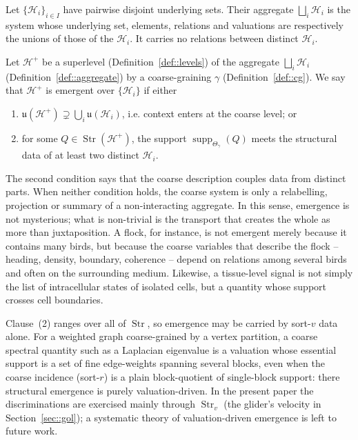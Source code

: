 \documentclass[runningheads]{llncs}
\newcommand{\Str}{\operatorname{Str}}
\newcommand{\supp}{\operatorname{supp}}
\begin{document}
\begin{definition}[Aggregate]\label{def::aggregate}
Let $\{\mathcal H_i\}_{i\in I}$ have pairwise disjoint underlying sets. Their aggregate $\bigsqcup_i\mathcal H_i$ is the system whose underlying set, elements, relations and valuations are respectively the unions of those of the $\mathcal H_i$. It carries no relations between distinct $\mathcal H_i$.
\end{definition}

\begin{definition}\label{def::emerg}
Let $\mathcal H^+$ be a superlevel (Definition~\ref{def::levels}) of the aggregate $\bigsqcup_i\mathcal H_i$ (Definition~\ref{def::aggregate}) by a coarse-graining $\gamma$ (Definition~\ref{def::cg}). We say that $\mathcal H^+$ is emergent over $\{\mathcal H_i\}$ if either
\begin{enumerate}
\item $\mathfrak u(\mathcal H^+)\supsetneq\bigcup_i\mathfrak u(\mathcal H_i)$, i.e. context enters at the coarse level; or
\item for some $Q\in\Str(\mathcal H^+)$, the support $\supp_{\Theta_\gamma}(Q)$ meets the structural data of at least two distinct $\mathcal H_i$.
\end{enumerate}
\end{definition}

The second condition says that the coarse description couples data from distinct parts. When neither condition holds, the coarse system is only a relabelling, projection or summary of a non-interacting aggregate. In this sense, emergence is not mysterious; what is non-trivial is the transport that creates the whole as more than juxtaposition. A flock, for instance, is not emergent merely because it contains many birds, but because the coarse variables that describe the flock -- heading, density, boundary, coherence -- depend on relations among several birds and often on the surrounding medium. Likewise, a tissue-level signal is not simply the list of intracellular states of isolated cells, but a quantity whose support crosses cell boundaries.

\begin{remark}\label{rem::valemerg}
Clause~(2) ranges over all of $\Str$, so emergence may be carried by sort-$v$ data alone. For a weighted graph coarse-grained by a vertex partition, a coarse spectral quantity such as a Laplacian eigenvalue is a valuation whose essential support is a set of fine edge-weights spanning several blocks, even when the coarse incidence (sort-$r$) is a plain block-quotient of single-block support: there structural emergence is purely valuation-driven. In the present paper the discriminations are exercised mainly through $\Str_v$ (the glider's velocity in Section~\ref{sec::gol}); a systematic theory of valuation-driven emergence is left to future work.
\end{remark}
\end{document}
